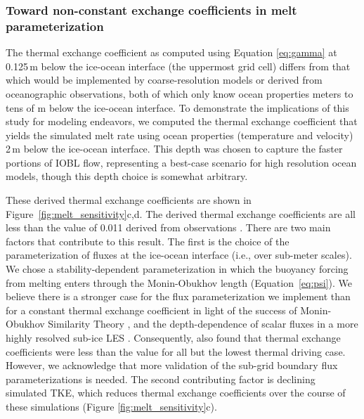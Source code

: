 \documentclass[tc, manuscript]{copernicus}
\begin{document}
\subsubsection{Toward non-constant exchange coefficients in melt parameterization}\label{disc:prm_gamma}

The thermal exchange coefficient as computed using Equation \ref{eq:gamma} at 0.125\,\unit{m} below the ice-ocean interface (the uppermost grid cell) differs from that which would be implemented by coarse-resolution models or derived from oceanographic observations, both of which only know ocean properties meters to tens of \unit{m} below the ice-ocean interface. To demonstrate the implications of this study for modeling endeavors, we computed the thermal exchange coefficient that yields the simulated melt rate using ocean properties (temperature and velocity) 2\,\unit{m} below the ice-ocean interface. This depth was chosen to capture the faster portions of IOBL flow, representing a best-case scenario for high resolution ocean models, though this depth choice is somewhat arbitrary. 

These derived thermal exchange coefficients are shown in Figure~\ref{fig:melt_sensitivity}c,d. The derived thermal exchange coefficients are all less than the value of 0.011 derived from observations \citep{jenkins_observation_2010}. There are two main factors that contribute to this result. The first is the choice of the parameterization of fluxes at the ice-ocean interface (i.e., over sub-meter scales). We chose a stability-dependent parameterization in which the buoyancy forcing from melting enters through the Monin-Obukhov length (Equation~\ref{eq:psi}). We believe there is a stronger case for the flux parameterization we implement than for a constant thermal exchange coefficient in light of the success of Monin-Obukhov Similarity Theory \citep{monin_basic_1954, mcphee_air-ice-ocean_2008}, and the depth-dependence of scalar fluxes in a more highly resolved sub-ice LES \citep{vreugdenhil_stratification_2019}. Consequently, \citet{vreugdenhil_stratification_2019} also found that thermal exchange coefficients were less than the \citet{jenkins_observation_2010} value for all but the lowest thermal driving case. However, we acknowledge that more validation of the sub-grid boundary flux parameterizations is needed. The second contributing factor is declining simulated TKE, which reduces thermal exchange coefficients over the course of these simulations (Figure \ref{fig:melt_sensitivity}c). 
\end{document}
